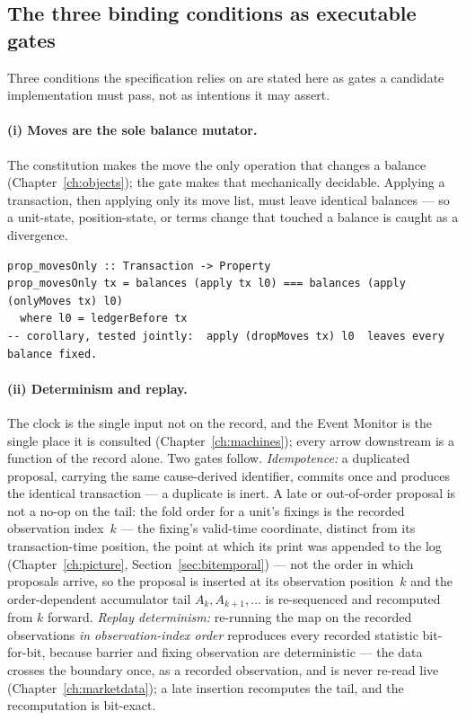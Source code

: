 \documentclass[11pt,a4paper]{article}
\begin{document}
\subsection{The three binding conditions as executable gates}

Three conditions the specification relies on are stated here as gates a candidate
implementation must pass, not as intentions it may assert.

\paragraph{(i) Moves are the sole balance mutator.}
The constitution makes the move the only operation that changes a balance
(Chapter~\ref{ch:objects}); the gate makes that mechanically decidable. Applying a
transaction, then applying only its move list, must leave identical balances --- so a
unit-state, position-state, or terms change that touched a balance is caught as a divergence.

\begin{lstlisting}
prop_movesOnly :: Transaction -> Property
prop_movesOnly tx = balances (apply tx l0) === balances (apply (onlyMoves tx) l0)
  where l0 = ledgerBefore tx
-- corollary, tested jointly:  apply (dropMoves tx) l0  leaves every balance fixed.
\end{lstlisting}

\paragraph{(ii) Determinism and replay.}
The clock is the single input not on the record, and the Event Monitor is the single place it
is consulted (Chapter~\ref{ch:machines}); every arrow downstream is a function of the record
alone. Two gates follow. \emph{Idempotence:} a duplicated proposal, carrying the same
cause-derived identifier, commits once and produces the identical transaction --- a
duplicate is inert. A late or out-of-order proposal is not a no-op on the tail: the
fold order for a unit's fixings is the recorded observation index~$k$ --- the fixing's
valid-time coordinate, distinct from its transaction-time position, the point at which its
print was appended to the log (Chapter~\ref{ch:picture}, Section~\ref{sec:bitemporal}) ---
not the order in which proposals arrive, so the proposal is inserted at its observation
position~$k$ and the order-dependent accumulator tail $A_{k},A_{k+1},\dots$ is re-sequenced
and recomputed from $k$ forward. \emph{Replay
determinism:} re-running the map on the recorded observations \emph{in observation-index
order} reproduces every recorded statistic bit-for-bit, because barrier and fixing
observation are deterministic --- the data crosses the boundary once, as a recorded
observation, and is never re-read live (Chapter~\ref{ch:marketdata}); a late insertion
recomputes the tail, and the recomputation is bit-exact.
\end{document}
